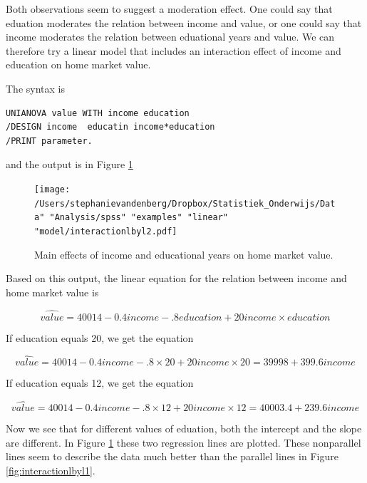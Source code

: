 \documentclass[]{report}\usepackage[]{graphicx}\usepackage[]{color}
\begin{document}
Both observations seem to suggest a moderation effect. One could say that eduation moderates the relation between income and value, or one could say that income moderates the relation between eduational years and value. We can therefore try a linear model that includes an interaction effect of income and education on home market value. 

The syntax is 

\begin{verbatim}
UNIANOVA value WITH income education
/DESIGN income  educatin income*education
/PRINT parameter.
\end{verbatim}

and the output is in Figure \ref{fig:interactionlbyl2}

\begin{figure}[h]
    \begin{center}
       \texttt{[image: /Users/stephanievandenberg/Dropbox/Statistiek\_Onderwijs/Data" "Analysis/spss" "examples"  "linear" "model/interactionlbyl2.pdf]}
    \end{center}
    \label{fig:interactionlbyl2}
    \caption{Main effects of income and educational years on home market value.}
\end{figure}

Based on this output, the linear equation for the relation between income and home market value is 

\begin{equation}
\widehat{value}= 40014 -0.4 income -.8 education + 20 income \times education
\end{equation}

If education equals 20, we get the equation

\begin{equation}
\widehat{value}= 40014 -0.4 income -.8 \times 20 + 20 income \times 20 = 39998 + 399.6 income
\end{equation}

If education equals 12, we get the equation 

\begin{equation}
\widehat{value}= 40014 - 0.4 income -.8 \times 12 + 20 income \times 12 = 40003.4 + 239.6 income
\end{equation}

Now we see that for different values of eduation, both the intercept and the slope are different. In Figure \ref{fig:interactionlbyl2} these two regression lines are plotted. These nonparallel lines seem to describe the data much better than the parallel lines in Figure \ref{fig:interactionlbyl1}. 
\end{document}
